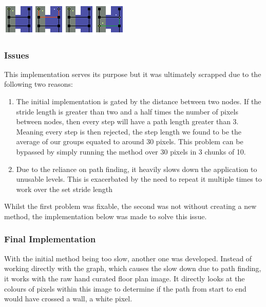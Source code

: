 \documentclass[main.tex]{subfiles}
\begin{document}
\begin{center}
\includegraphics[scale=1.5]{images-implementation/collision1.png}
\label{fig:iniCol}
\end{center}

\subsubsection{Issues}

This implementation serves its purpose but it was ultimately scrapped due to the following two reasons:

\begin{enumerate}
	\item The initial implementation is gated by the distance between two nodes. If the stride length is greater than two and a half times the number of pixels between nodes, then every step will have a path length greater than 3. Meaning every step is then rejected, the step length we found to be the average of our groups equated to around 30 pixels. This problem can be bypassed by simply running the method over 30 pixels in 3 chunks of 10.
	\item Due to the reliance on path finding, it heavily slows down the application to unusable levels. This is exacerbated by the need to repeat it multiple times to work over the set stride length
\end{enumerate}

Whilst the first problem was fixable, the second was not without creating a new method, the implementation below was made to solve this issue.

\subsubsection{Final Implementation}

With the initial method being too slow, another one was developed. Instead of working directly with the graph, which causes the slow down due to path finding, it works with the raw hand curated floor plan image. It directly looks at the colours of pixels within this image to determine if the path from start to end would have crossed a wall, a white pixel.
\end{document}

